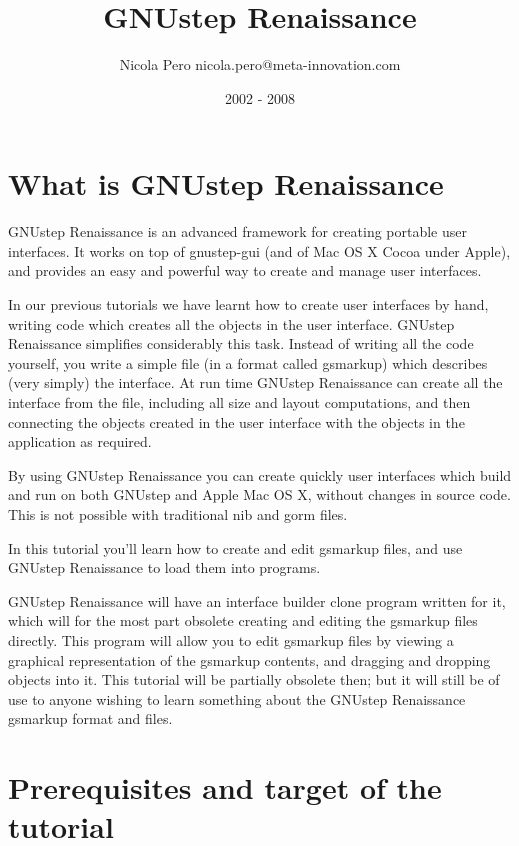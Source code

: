 \documentclass[a4paper]{article}
\begin{document}
\author{Nicola Pero nicola.pero@meta-innovation.com}
\title{GNUstep Renaissance}
\date{2002 - 2008}
\maketitle

\section{What is GNUstep Renaissance}

GNUstep Renaissance is an advanced framework for creating portable
user interfaces.  It works on top of gnustep-gui (and of Mac OS X
Cocoa under Apple), and provides an easy and powerful way to create
and manage user interfaces.

In our previous tutorials we have learnt how to create user interfaces
by hand, writing code which creates all the objects in the user
interface.  GNUstep Renaissance simplifies considerably this task.
Instead of writing all the code yourself, you write a simple file (in
a format called gsmarkup) which describes (very simply) the interface.
At run time GNUstep Renaissance can create all the interface from the
file, including all size and layout computations, and then connecting
the objects created in the user interface with the objects in the
application as required.

By using GNUstep Renaissance you can create quickly user interfaces
which build and run on both GNUstep and Apple Mac OS X, without changes in
source code.  This is not possible with traditional nib and gorm
files.

In this tutorial you'll learn how to create and edit gsmarkup files,
and use GNUstep Renaissance to load them into programs.

GNUstep Renaissance will have an interface builder clone program
written for it, which will for the most part obsolete creating and
editing the gsmarkup files directly.  This program will allow you to
edit gsmarkup files by viewing a graphical representation of the
gsmarkup contents, and dragging and dropping objects into it.  This
tutorial will be partially obsolete then; but it will still be of use
to anyone wishing to learn something about the GNUstep Renaissance
gsmarkup format and files.

\section{Prerequisites and target of the tutorial}
\end{document}
